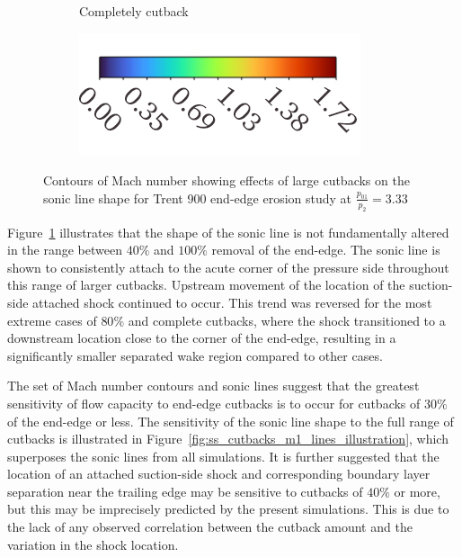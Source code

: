 \documentclass[a4paper, 11pt, oneside]{report}
\begin{document}
\begin{figure}[H]
\begin{subfigure}{.45\textwidth}
		\caption{Completely cutback}
	\end{subfigure}
	\begin{subfigure}{.4\textwidth}
		\centering
		\includegraphics[width=\linewidth]{figs/mach_legend_choked_horizontal.png}
	\end{subfigure}
	\caption{Contours of Mach number showing effects of large cutbacks on the sonic line shape for Trent 900 end-edge erosion study at $\frac{p_{01}}{p_2}=3.33$}
	\label{fig:ss_cutbacks_4-10}
\end{figure}

Figure~\ref{fig:ss_cutbacks_4-10} illustrates that the shape of the sonic line is not fundamentally altered in the range between $40\%$ and $100\%$ removal of the end-edge. The sonic line is shown to consistently attach to the acute corner of the pressure side throughout this range of larger cutbacks. Upstream movement of the location of the suction-side attached shock continued to occur. This trend was reversed for the most extreme cases of $80\%$ and complete cutbacks, where the shock transitioned to a downstream location close to the corner of the end-edge, resulting in a significantly smaller separated wake region compared to other cases.

The set of Mach number contours and sonic lines suggest that the greatest sensitivity of flow capacity to end-edge cutbacks is to occur for cutbacks of $30\%$ of the end-edge or less. The sensitivity of the sonic line shape to the full range of cutbacks is illustrated in Figure~\ref{fig:ss_cutbacks_m1_lines_illustration}, which superposes the sonic lines from all simulations. It is further suggested that the location of an attached suction-side shock and corresponding boundary layer separation near the trailing edge may be sensitive to cutbacks of $40\%$ or more, but this may be imprecisely predicted by the present simulations. This is due to the lack of any observed correlation between the cutback amount and the variation in the shock location.
\end{document}
